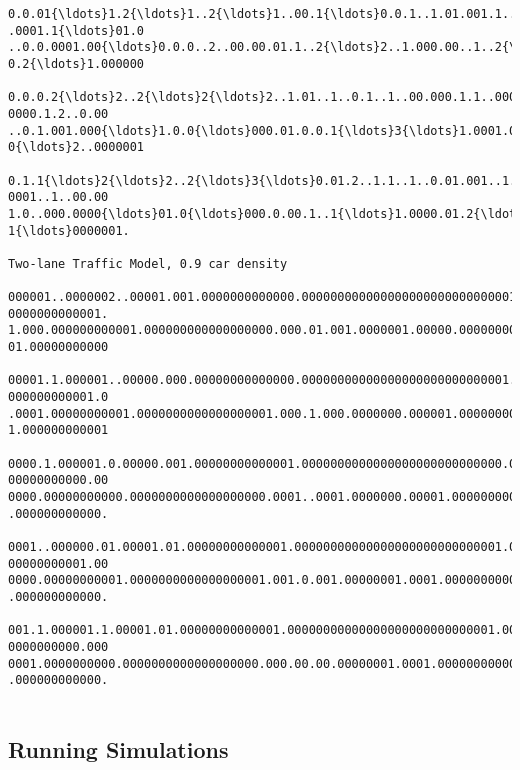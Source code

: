 \documentclass[11pt]{article}
\begin{document}
\begin{Verbatim}[commandchars=\\\{\},fontsize=\footnotesize]
0.0.01{\ldots}1.2{\ldots}1..2{\ldots}1..00.1{\ldots}0.0.1..1.01.001.1..1.000..00000000.1.0{\ldots}2..2..001
.0001.1{\ldots}01.0
..0.0.0001.00{\ldots}0.0.0..2..00.00.01.1..2{\ldots}2..1.000.00..1..2{\ldots}0000..2{\ldots}0000.2..000.
0.2{\ldots}1.000000

0.0.0.2{\ldots}2..2{\ldots}2{\ldots}2..1.01..1..0.1..1..00.000.1.1..0001..00000000..00{\ldots}1..001.
0000.1.2..0.00
..0.1.001.000{\ldots}1.0.0{\ldots}000.01.0.0.1{\ldots}3{\ldots}1.0001.01{\ldots}2{\ldots}2..0001{\ldots}1.0001{\ldots}0000.
0{\ldots}2..0000001

0.1.1{\ldots}2{\ldots}2..2{\ldots}3{\ldots}0.01.2..1.1..1..0.01.001..1.1.000.1.00000001..01{\ldots}1.01.0
0001..1..00.00
1.0..000.0000{\ldots}01.0{\ldots}000.0.00.1..1{\ldots}1.0000.01.2{\ldots}2{\ldots}0001.1{\ldots}0001.1..0001.
1{\ldots}0000001.

Two-lane Traffic Model, 0.9 car density

000001..0000002..00001.001.0000000000000.000000000000000000000000000001.000.0000000000
0000000000001.
1.000.000000000001.000000000000000000.000.01.001.0000001.00000.00000000000000000000000
01.00000000000

00001.1.000001..00000.000.00000000000000.00000000000000000000000000001.0000.0000000000
000000000001.0
.0001.00000000001.0000000000000000001.000.1.000.0000000.000001.00000000000000000000000
1.000000000001

0000.1.000001.0.00000.001.00000000000001.0000000000000000000000000000.00001.0000000000
00000000000.00
0000.00000000000.0000000000000000000.0001..0001.0000000.00001.000000000000000000000000
.000000000000.

0001..000000.01.00001.01.00000000000001.00000000000000000000000000001.0001.00000000000
00000000001.00
0000.00000000001.0000000000000000001.001.0.001.00000001.0001.0000000000000000000000000
.000000000000.

001.1.000001.1.00001.01.00000000000001.00000000000000000000000000001.0001.000000000000
0000000000.000
0001.0000000000.0000000000000000000.000.00.00.00000001.0001.00000000000000000000000001
.000000000000.


    \end{Verbatim}

    \subsection{Running Simulations}
\end{document}
